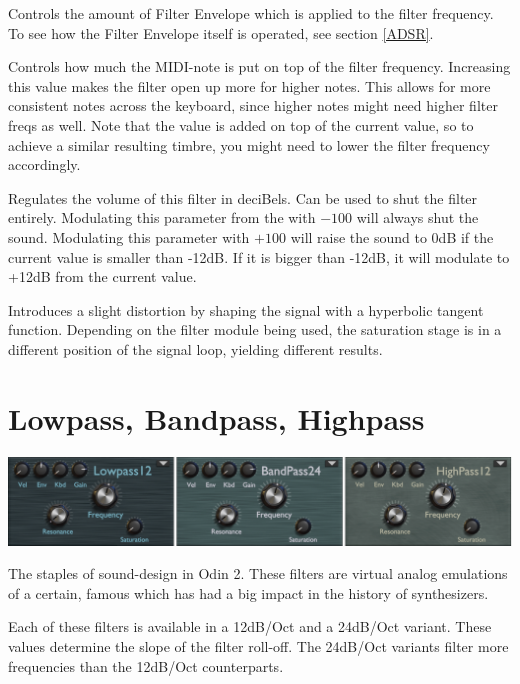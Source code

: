 {Controls the amount of Filter Envelope which is applied to the filter frequency. To see how the Filter Envelope itself is operated, see section \ref{ADSR}.}

{Controls how much the MIDI-note is put on top of the filter frequency. Increasing this value makes the filter open up more for higher notes. This allows for more consistent notes across the keyboard, since higher notes might need higher filter freqs as well. Note that the value is added on top of the current value, so to achieve a similar resulting timbre, you might need to lower the filter frequency accordingly.}

{Regulates the volume of this filter in deciBels. Can be used to shut the filter entirely. Modulating this parameter from the \modmatrix  with $-100$ will always shut the sound. Modulating this parameter with $+100$ will raise the sound to 0dB if the current value is smaller than -12dB. If it is bigger than -12dB, it will modulate to +12dB from the current value.}

{Introduces a slight distortion by shaping the signal with a hyperbolic tangent function. Depending on the filter module being used, the saturation stage is in a different position of the signal loop, yielding different results.}

\section{Lowpass, Bandpass, Highpass}
\begin{center}
    \includegraphics[width=\textwidth]{graphics/lp_bp_hp.png}
\end{center}

The staples of sound-design in Odin 2. These filters are virtual analog emulations of a certain, famous  which has had a big impact in the history of synthesizers.

Each of these filters is available in a 12dB/Oct and a 24dB/Oct variant. These values determine the slope of the filter roll-off. The 24dB/Oct variants filter more frequencies than the 12dB/Oct counterparts.

